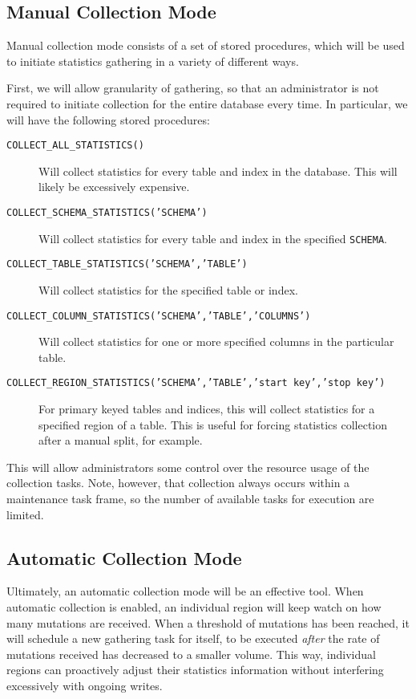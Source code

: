 \subsection{Manual Collection Mode}
Manual collection mode consists of a set of stored procedures, which will be used to initiate statistics gathering in a variety of different ways.

First, we will allow granularity of gathering, so that an administrator is not required to initiate collection for the entire database every time. In particular, we will have the following stored procedures:

\begin{description}
				\item[\texttt{COLLECT\_ALL\_STATISTICS()}] Will collect statistics for every table and index in the database. This will likely be excessively expensive.
				\item[\texttt{COLLECT\_SCHEMA\_STATISTICS('SCHEMA')}] Will collect statistics for every table and index in the specified \texttt{SCHEMA}. 
				\item[\texttt{COLLECT\_TABLE\_STATISTICS('SCHEMA','TABLE')}] Will collect statistics for the specified table or index.
				\item[\texttt{COLLECT\_COLUMN\_STATISTICS('SCHEMA','TABLE','COLUMNS')}] Will collect statistics for one or more specified columns in the particular table.
								\item[\texttt{COLLECT\_REGION\_STATISTICS('SCHEMA','TABLE','start key','stop key')}] For primary keyed tables and indices, this will collect statistics for a specified region of a table. This is useful for forcing statistics collection after a manual split, for example.
\end{description}
This will allow administrators some control over the resource usage of the collection tasks. Note, however, that collection always occurs within a maintenance task frame, so the number of available tasks for execution are limited.

\subsection{Automatic Collection Mode}
Ultimately, an automatic collection mode will be an effective tool. When automatic collection is enabled, an individual region will keep watch on how many mutations are received. When a threshold of mutations has been reached, it will schedule a new gathering task for itself, to be executed \emph{after} the rate of mutations received has decreased to a smaller volume. This way, individual regions can proactively adjust their statistics information without interfering excessively with ongoing writes. 

